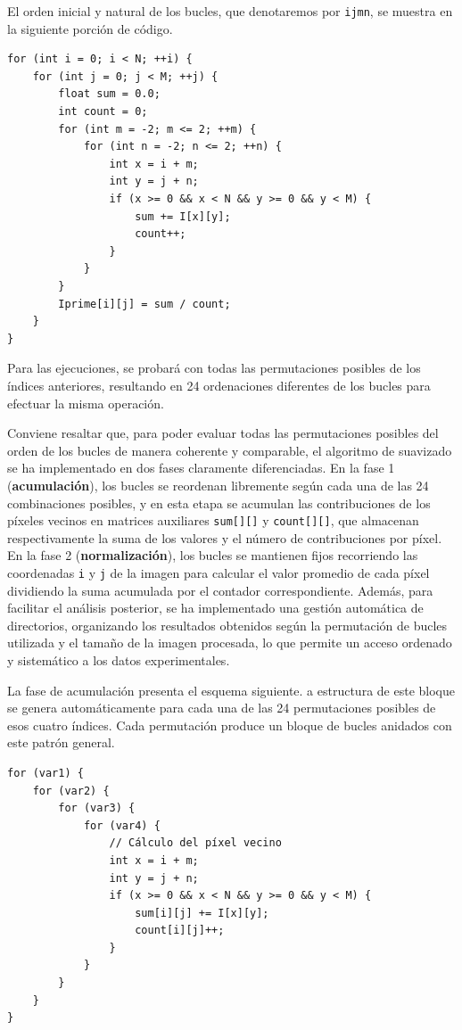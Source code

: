 \documentclass[11pt,a4paper,twoside]{article}
\theoremstyle{definition}
\begin{document}
	El orden inicial y natural de los bucles, que denotaremos por \texttt{ijmn}, se muestra en la siguiente porción de código.
	
	\begin{verbatim}
for (int i = 0; i < N; ++i) {
	for (int j = 0; j < M; ++j) {
		float sum = 0.0;
		int count = 0;
		for (int m = -2; m <= 2; ++m) {
			for (int n = -2; n <= 2; ++n) {
				int x = i + m;
				int y = j + n;
				if (x >= 0 && x < N && y >= 0 && y < M) {
					sum += I[x][y];
					count++;
				}
			}
		}
		Iprime[i][j] = sum / count;
	}	
}
	\end{verbatim}

	Para las ejecuciones, se probará con todas las permutaciones posibles de los índices anteriores, resultando en 24 ordenaciones diferentes de los bucles para efectuar la misma operación.
	
	Conviene resaltar que, para poder evaluar todas las permutaciones posibles del orden de los bucles de manera coherente y comparable, el algoritmo de suavizado se ha implementado en dos fases claramente diferenciadas. En la fase 1 (\textbf{acumulación}), los bucles se reordenan libremente según cada una de las 24 combinaciones posibles, y en esta etapa se acumulan las contribuciones de los píxeles vecinos en matrices auxiliares \texttt{sum[][]} y \texttt{count[][]}, que almacenan respectivamente la suma de los valores y el número de contribuciones por píxel. En la fase 2 (\textbf{normalización}), los bucles se mantienen fijos recorriendo las coordenadas \texttt{i} y \texttt{j} de la imagen para calcular el valor promedio de cada píxel dividiendo la suma acumulada por el contador correspondiente. Además, para facilitar el análisis posterior, se ha implementado una gestión automática de directorios, organizando los resultados obtenidos según la permutación de bucles utilizada y el tamaño de la imagen procesada, lo que permite un acceso ordenado y sistemático a los datos experimentales.
	
	La fase de acumulación presenta el esquema siguiente. a estructura de este bloque se genera automáticamente para cada una de las 24 permutaciones posibles de esos cuatro índices. Cada permutación produce un bloque de bucles anidados con este patrón general.
	\begin{verbatim}
for (var1) {
	for (var2) {
		for (var3) {
			for (var4) {
				// Cálculo del píxel vecino
				int x = i + m;
				int y = j + n;
				if (x >= 0 && x < N && y >= 0 && y < M) {
					sum[i][j] += I[x][y];
					count[i][j]++;
				}
			}
		}
	}
}
	\end{verbatim}
	
\end{document}
